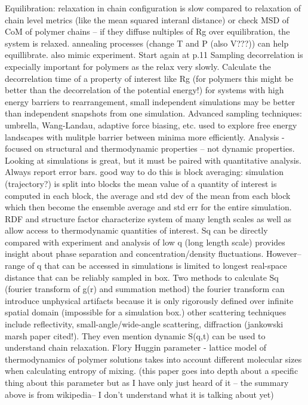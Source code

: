 \documentclass{article}
\begin{document}
Equilibration:
relaxation in chain configuration is slow compared to relaxation of chain level metrics (like the mean squared interanl distance) or check MSD of CoM of polymer chains -- if they diffuse nultiples of Rg over equilibration, the system is relaxed. annealing processes (change T and P (also V???)) can help equillibrate. also mimic experiment.
Start again at p.11 Sampling
decorrelation is expecially important for polymers as the relax very slowly. Calculate the decorrelation time of a property of interest like Rg (for polymers this might be better than the decorrelation of the potential energy!)
for systems with high energy barriers to rearrangement, small independent simulations may be better than independent snapshots from one simulation.
Advanced sampling techniques: umbrella, Wang-Landau, adaptive force biasing, etc. used to explore free energy landscapes with mulitple barrier between minima more efficiently.
Analysis - focused on structural and thermodynamic properties -- not dynamic properties.
Looking at simulations is great, but it must be paired with quantitative analysis. Always report error bars. good way to do this is block averaging: simulation (trajectory?) is split into blocks the mean value of a quantity of interest is computed in each block, the average and std dev of the mean from each block which then become the ensemble average and std err for the entire simulation.
RDF and structure factor characterize system of many length scales as well as allow access to thermodynamic quantities of interest. Sq can be directly compared with experiment and analysis of low q (long length scale) provides insight about phase separation and concentration/density fluctuations. However--range of q that can be accessed in simulations is limited to longest real-space distance that can be reliably sampled in box. Two methods to calculate Sq (fourier transform of g(r) and summation method) the fourier transform can introduce unphysical artifacts because it is only rigorously defined over infinite spatial domain (impossible for a simulation box.)
other scattering techniques include reflectivity, small-angle/wide-angle scattering, diffraction (jankowski marsh paper cited!). They even mention dynamic S(q,t) can be used to understand chain relaxation.
Flory Huggin parameter - lattice model of thermodynamics of polymer solutions takes into account different molecular sizes when calculating entropy of mixing. (this paper goes into depth about a specific thing about this parameter but as I have only just heard of it -- the summary above is from wikipedia-- I don't understand what it is talking about yet)
\end{document}
